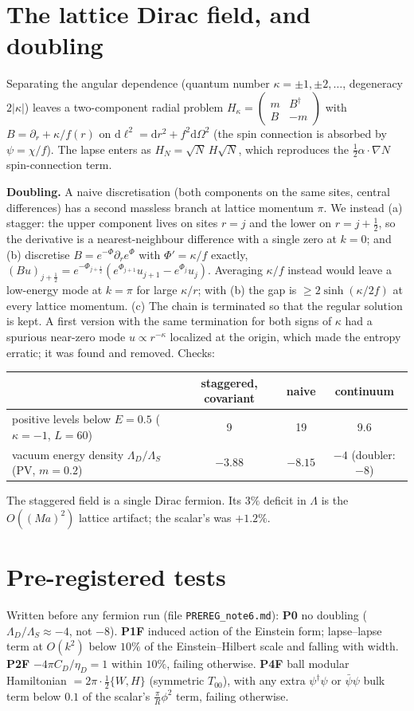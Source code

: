 \documentclass[11pt]{article}
\newcommand{\dd}{\mathrm{d}}
\begin{document}
\section{The lattice Dirac field, and doubling}
Separating the angular dependence (quantum number $\kappa=\pm1,\pm2,\dots$, degeneracy $2|\kappa|$) leaves a two-component radial problem $H_\kappa=\begin{pmatrix}m&B^\dagger\\B&-m\end{pmatrix}$ with $B=\partial_r+\kappa/f(r)$ on $\dd\ell^2=\dd r^2+f^2\dd\Omega^2$ (the spin connection is absorbed by $\psi=\chi/f$). The lapse enters as $H_N=\sqrt N\,H\sqrt N$, which reproduces the $\tfrac12\alpha\cdot\nabla N$ spin-connection term.

\textbf{Doubling.} A naive discretisation (both components on the same sites, central differences) has a second massless branch at lattice momentum $\pi$. We instead (a) stagger: the upper component lives on sites $r=j$ and the lower on $r=j+\tfrac12$, so the derivative is a nearest-neighbour difference with a single zero at $k=0$; and (b) discretise $B=e^{-\Phi}\partial_re^{\Phi}$ with $\Phi'=\kappa/f$ exactly, $(Bu)_{j+\frac12}=e^{-\Phi_{j+\frac12}}(e^{\Phi_{j+1}}u_{j+1}-e^{\Phi_j}u_j)$. Averaging $\kappa/f$ instead would leave a low-energy mode at $k=\pi$ for large $\kappa/r$; with (b) the gap is $\ge2\sinh(\kappa/2f)$ at every lattice momentum. (c) The chain is terminated so that the regular solution is kept. A first version with the same termination for both signs of $\kappa$ had a spurious near-zero mode $u\propto r^{-\kappa}$ localized at the origin, which made the entropy erratic; it was found and removed. Checks:
\begin{center}\small\begin{tabular}{lccc}\toprule
& staggered, covariant & naive & continuum\\\midrule
positive levels below $E=0.5$ ($\kappa=-1$, $L=60$) & 9 & 19 & 9.6\\
vacuum energy density $\Lambda_D/\Lambda_S$ (PV, $m=0.2$) & $-3.88$ & $-8.15$ & $-4$ (doubler: $-8$)\\\bottomrule\end{tabular}\end{center}
The staggered field is a single Dirac fermion. Its $3\%$ deficit in $\Lambda$ is the $O((Ma)^2)$ lattice artifact; the scalar's was $+1.2\%$.

\section{Pre-registered tests}
Written before any fermion run (file \texttt{PREREG\_note6.md}):
\textbf{P0} no doubling ($\Lambda_D/\Lambda_S\approx-4$, not $-8$).
\textbf{P1F} induced action of the Einstein form; lapse--lapse term at $O(k^2)$ below $10\%$ of the Einstein--Hilbert scale and falling with width.
\textbf{P2F} $-4\pi C_D/\eta_D=1$ within $10\%$, failing otherwise.
\textbf{P4F} ball modular Hamiltonian $=2\pi\cdot\tfrac12\{W,H\}$ (symmetric $T_{00}$), with any extra $\psi^\dagger\psi$ or $\bar\psi\psi$ bulk term below $0.1$ of the scalar's $\tfrac{\pi}{R}\phi^2$ term, failing otherwise.
\end{document}
